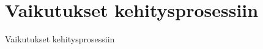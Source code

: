 \chapter{Vaikutukset kehitysprosessiin} \label{Vaikutukset kehitysprosessiin}

Vaikutukset kehitysprosessiin


